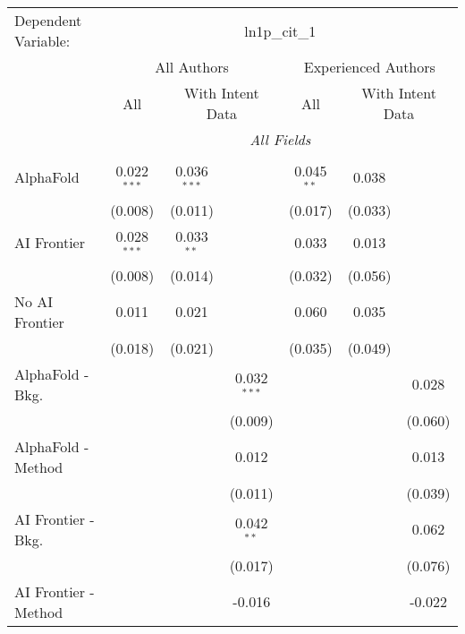 \begingroup
\centering
\begin{tabular}{lcccccc}
   \tabularnewline \midrule \midrule
   Dependent Variable: & \multicolumn{6}{c}{ln1p\_cit\_1}\\
 & \multicolumn{3}{c}{All Authors} & \multicolumn{3}{c}{Experienced Authors} \\
\cmidrule(lr){2-4} \cmidrule(lr){5-7}
 & \multicolumn{1}{c}{All} & \multicolumn{2}{c}{With Intent Data} & \multicolumn{1}{c}{All} & \multicolumn{2}{c}{With Intent Data} \\
\cmidrule(lr){2-2} \cmidrule(lr){3-4} \cmidrule(lr){5-5} \cmidrule(lr){6-7}
 & \multicolumn{6}{c}{\textit{All Fields}} \\ \\
   AlphaFold               & 0.022$^{***}$ & 0.036$^{***}$ &               & 0.045$^{**}$ & 0.038   &   \\   
                           & (0.008)       & (0.011)       &               & (0.017)      & (0.033) &   \\   
   AI Frontier             & 0.028$^{***}$ & 0.033$^{**}$  &               & 0.033        & 0.013   &   \\   
                           & (0.008)       & (0.014)       &               & (0.032)      & (0.056) &   \\   
   No AI Frontier          & 0.011         & 0.021         &               & 0.060        & 0.035   &   \\   
                           & (0.018)       & (0.021)       &               & (0.035)      & (0.049) &   \\   
   AlphaFold - Bkg.        &               &               & 0.032$^{***}$ &              &         & 0.028\\   
                           &               &               & (0.009)       &              &         & (0.060)\\   
   AlphaFold - Method      &               &               & 0.012         &              &         & 0.013\\   
                           &               &               & (0.011)       &              &         & (0.039)\\   
   AI Frontier - Bkg.      &               &               & 0.042$^{**}$  &              &         & 0.062\\   
                           &               &               & (0.017)       &              &         & (0.076)\\   
   AI Frontier - Method    &               &               & -0.016        &              &         & -0.022\\   

\end{tabular}
